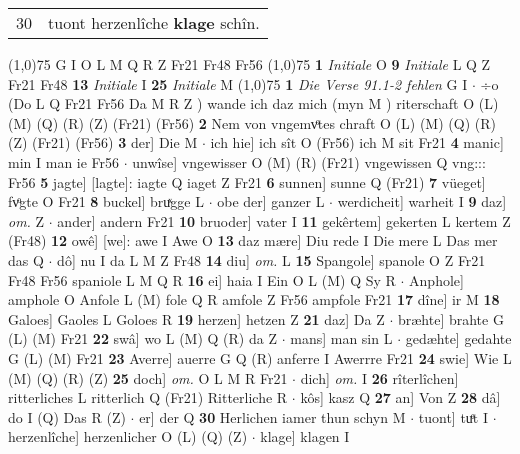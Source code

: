 \documentclass[8pt,a4paper,notitlepage]{article}
\begin{document}
\begin{table}[ht]
\begin{minipage}[t]{0.5\linewidth}
\begin{tabular}{rl}
30 & tuont herzenlîche \textbf{klage} schîn.\\ 
\end{tabular}
\scriptsize
\line(1,0){75} \newline
G I O L M Q R Z Fr21 Fr48 Fr56 \newline
\line(1,0){75} \newline
\textbf{1} \textit{Initiale} O  \textbf{9} \textit{Initiale} L Q Z Fr21 Fr48  \textbf{13} \textit{Initiale} I  \textbf{25} \textit{Initiale} M  \newline
\line(1,0){75} \newline
\textbf{1} \textit{Die Verse 91.1-2 fehlen} G I   $\cdot$ ÷o (Do L Q Fr21 Fr56 Da M R Z ) wande ich daz mich (myn M ) riterschaft O (L) (M) (Q) (R) (Z) (Fr21) (Fr56) \textbf{2} Nem von vngemvͦtes chraft O (L) (M) (Q) (R) (Z) (Fr21) (Fr56) \textbf{3} der] Die M  $\cdot$ ich hie] ich sît O (Fr56) ich M sit Fr21 \textbf{4} manic] min I man ie Fr56  $\cdot$ unwîse] vngewisser O (M) (R) (Fr21) vngewissen Q vng::: Fr56 \textbf{5} jagte] [lagte]: iagte Q iaget Z Fr21 \textbf{6} sunnen] sunne Q (Fr21) \textbf{7} vüeget] fvͦgte O Fr21 \textbf{8} buckel] bruͯgge L  $\cdot$ obe der] ganzer L  $\cdot$ werdicheit] warheit I \textbf{9} daz] \textit{om.} Z  $\cdot$ ander] andern Fr21 \textbf{10} bruoder] vater I \textbf{11} gekêrtem] gekerten L kertem Z (Fr48) \textbf{12} owê] [we]: awe I Awe O \textbf{13} daz mære] Diu rede I Die mere L Das mer das Q  $\cdot$ dô] nu I da L M Z Fr48 \textbf{14} diu] \textit{om.} L \textbf{15} Spangole] spanole O Z Fr21 Fr48 Fr56 spaniole L M Q R \textbf{16} ei] haia I Ein O L (M) Q Sy R  $\cdot$ Anphole] amphole O Anfole L (M) fole Q R amfole Z Fr56 ampfole Fr21 \textbf{17} dîne] ir M \textbf{18} Galoes] Gaoles L Goloes R \textbf{19} herzen] hetzen Z \textbf{21} daz] Da Z  $\cdot$ bræhte] brahte G (L) (M) Fr21 \textbf{22} swâ] wo L (M) Q (R) da Z  $\cdot$ mans] man sin L  $\cdot$ gedæhte] gedahte G (L) (M) Fr21 \textbf{23} Averre] auerre G Q (R) anferre I Awerrre Fr21 \textbf{24} swie] Wie L (M) (Q) (R) (Z) \textbf{25} doch] \textit{om.} O L M R Fr21  $\cdot$ dich] \textit{om.} I \textbf{26} rîterlîchen] ritterliches L ritterlich Q (Fr21) Ritterliche R  $\cdot$ kôs] kasz Q \textbf{27} an] Von Z \textbf{28} dâ] do I (Q) Das R (Z)  $\cdot$ er] der Q \textbf{30} Herlichen iamer thun schyn M  $\cdot$ tuont] tuͤt I  $\cdot$ herzenlîche] herzenlicher O (L) (Q) (Z)  $\cdot$ klage] klagen I \newline
\end{minipage}
\hspace{0.5cm}

\end{table}
\end{document}
